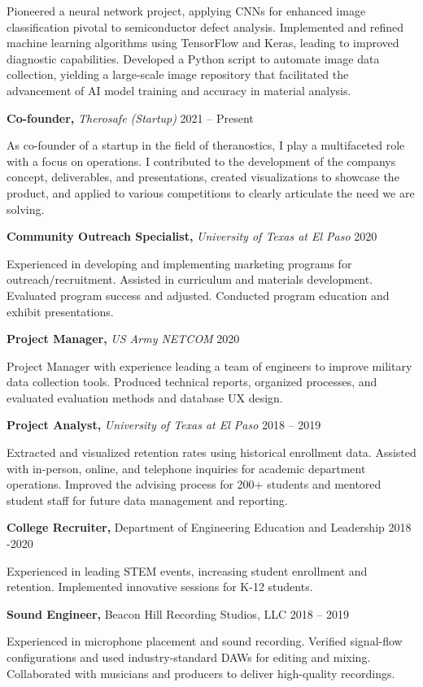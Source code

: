 \documentclass[11pt]{article}
\begin{document}
Pioneered a neural network project, applying CNNs for enhanced image classification pivotal to semiconductor defect analysis. Implemented and refined machine learning algorithms using TensorFlow and Keras, leading to improved diagnostic capabilities. Developed a Python script to automate image data collection, yielding a large-scale image repository that facilitated the advancement of AI model training and accuracy in material analysis.

\textbf{Co-founder,} \emph{Therosafe (Startup)} 2021 -- Present

As co-founder of a startup in the field of theranostics, I play a multifaceted role with a focus on operations. I contributed to the development of the company\textquotesingle s concept, deliverables, and presentations, created visualizations to showcase the product, and applied to various competitions to clearly articulate the need we are solving.

\textbf{Community Outreach Specialist,} \emph{University of Texas at El Paso} 2020

Experienced in developing and implementing marketing programs for outreach/recruitment. Assisted in curriculum and materials development. Evaluated program success and adjusted. Conducted program education and exhibit presentations.

\textbf{Project Manager,} \emph{US Army NETCOM} 2020

Project Manager with experience leading a team of engineers to improve military data collection tools. Produced technical reports, organized processes, and evaluated evaluation methods and database UX design.

\textbf{Project Analyst,} \emph{University of Texas at El Paso} 2018 -- 2019

Extracted and visualized retention rates using historical enrollment data. Assisted with in-person, online, and telephone inquiries for academic department operations. Improved the advising process for 200+ students and mentored student staff for future data management and reporting.

\textbf{College Recruiter,} Department of Engineering Education and Leadership 2018 -2020

Experienced in leading STEM events, increasing student enrollment and retention. Implemented innovative sessions for K-12 students.

\textbf{Sound Engineer,} Beacon Hill Recording Studios, LLC 2018 -- 2019

Experienced in microphone placement and sound recording. Verified signal-flow configurations and used industry-standard DAWs for editing and mixing. Collaborated with musicians and producers to deliver high-quality recordings.
\end{document}
